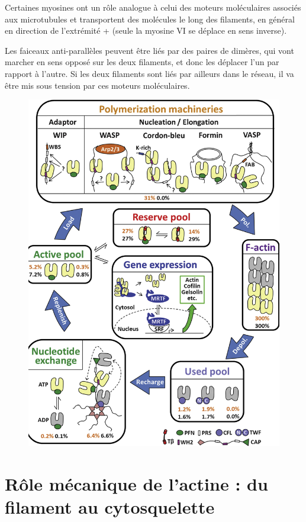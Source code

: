 Certaines myosines ont un rôle analogue à celui des moteurs moléculaires associés aux microtubules et transportent des molécules le long des filaments, en général en direction de l'extrémité + (seule la myosine VI se déplace en sens inverse). 


Les faiceaux anti-parallèles peuvent être liés par des paires de dimères, qui vont marcher en sens opposé sur les deux filaments, et donc les déplacer l'un par rapport à l'autre. Si les deux filaments sont liés par ailleurs dans le réseau, il va être mis sous tension par ces moteurs moléculaires.

\begin{figure}
\includegraphics[scale=0.25]{actine_cycle.png}
\end{figure}


\section{Rôle mécanique de l'actine : du filament au cytosquelette}

